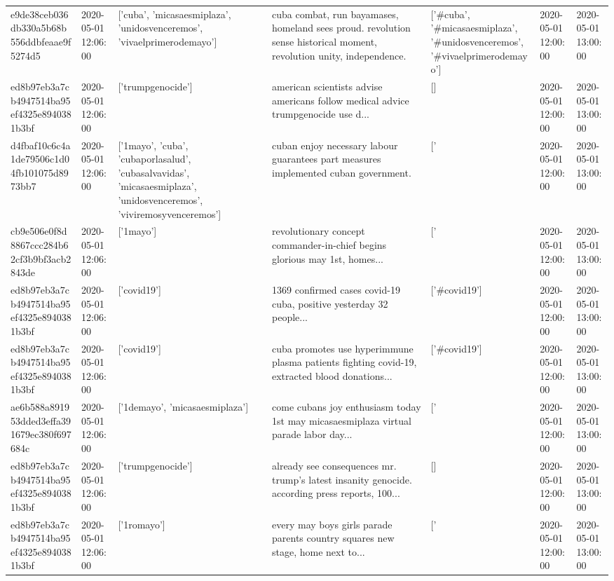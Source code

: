 \begin{tabular}{lllllll}
e9de38ceb036db330a5b68b556ddbfeaae9f5274d5 & 2020-05-01 12:06:00 & ['cuba', 'micasaesmiplaza', 'unidosvenceremos', 'vivaelprimerodemayo'] & cuba combat, run bayamases, homeland sees proud. revolution sense historical moment, revolution unity, independence. & ['#cuba', '#micasaesmiplaza', '#unidosvenceremos', '#vivaelprimerodemayo'] & 2020-05-01 12:00:00 & 2020-05-01 13:00:00 \\
ed8b97eb3a7cb4947514ba95ef4325e8940381b3bf & 2020-05-01 12:06:00 & ['trumpgenocide'] & american scientists advise americans follow medical advice trumpgenocide use d... & [] & 2020-05-01 12:00:00 & 2020-05-01 13:00:00 \\
d4fbaf10c6c4a1de79506c1d04fb101075d8973bb7 & 2020-05-01 12:06:00 & ['1mayo', 'cuba', 'cubaporlasalud', 'cubasalvavidas', 'micasaesmiplaza', 'unidosvenceremos', 'viviremosyvenceremos'] & cuban enjoy necessary labour guarantees part measures implemented cuban government. & ['#1mayo', '#cuba', '#cubaporlasalud', '#cubasalvavidas', '#micasaesmiplaza', '#unidosvenceremos', '#viviremosyvenceremos'] & 2020-05-01 12:00:00 & 2020-05-01 13:00:00 \\
cb9e506e0f8d8867ccc284b62cf3b9bf3acb2843de & 2020-05-01 12:06:00 & ['1mayo'] & revolutionary concept commander-in-chief begins glorious may 1st, homes... & ['#1mayo'] & 2020-05-01 12:00:00 & 2020-05-01 13:00:00 \\
ed8b97eb3a7cb4947514ba95ef4325e8940381b3bf & 2020-05-01 12:06:00 & ['covid19'] & 1369 confirmed cases covid-19 cuba, positive yesterday 32 people... & ['#covid19'] & 2020-05-01 12:00:00 & 2020-05-01 13:00:00 \\
ed8b97eb3a7cb4947514ba95ef4325e8940381b3bf & 2020-05-01 12:06:00 & ['covid19'] & cuba promotes use hyperimmune plasma patients fighting covid-19, extracted blood donations... & ['#covid19'] & 2020-05-01 12:00:00 & 2020-05-01 13:00:00 \\
ae6b588a891953dded3effa391679ec380f697684c & 2020-05-01 12:06:00 & ['1demayo', 'micasaesmiplaza'] & come cubans joy enthusiasm today 1st may micasaesmiplaza virtual parade labor day... & ['#1demayo', '#micasaesmiplaza'] & 2020-05-01 12:00:00 & 2020-05-01 13:00:00 \\
ed8b97eb3a7cb4947514ba95ef4325e8940381b3bf & 2020-05-01 12:06:00 & ['trumpgenocide'] & already see consequences mr. trump's latest insanity genocide. according press reports, 100... & [] & 2020-05-01 12:00:00 & 2020-05-01 13:00:00 \\
ed8b97eb3a7cb4947514ba95ef4325e8940381b3bf & 2020-05-01 12:06:00 & ['1romayo'] & every may boys girls parade parents country squares new stage, home next to... & ['#1romayo'] & 2020-05-01 12:00:00 & 2020-05-01 13:00:00 \\

\end{tabular}
